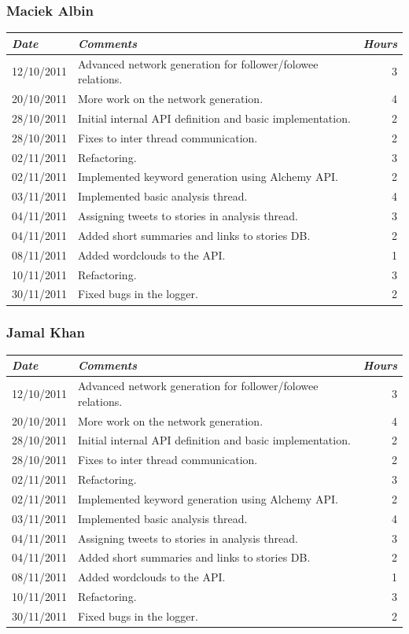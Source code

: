 \documentclass[a4paper,12pt]{article}
\begin{document}
	  \subsubsection{Maciek Albin}
	    \begin{tabular}{l | p{10cm} r}
	     \emph{\large Date} & \emph{\large Comments} & \emph{\large Hours}\\
	     \hline
	     12/10/2011 & Advanced network generation for follower/folowee relations. & 3\\
	     20/10/2011 & More work on the network generation. & 4\\
	     28/10/2011 & Initial internal API definition and basic implementation. & 2\\
	     28/10/2011 & Fixes to inter thread communication. & 2\\
	     02/11/2011 & Refactoring. & 3\\
	     02/11/2011 & Implemented keyword generation using Alchemy API. & 2\\
	     03/11/2011 & Implemented basic analysis thread. & 4\\
	     04/11/2011 & Assigning tweets to stories in analysis thread. & 3\\
	     04/11/2011 & Added short summaries and links to stories DB. & 2\\
	     08/11/2011 & Added wordclouds to the API. & 1\\
	     10/11/2011 & Refactoring. & 3\\
	     30/11/2011 & Fixed bugs in the logger. & 2
	    \end{tabular}
	    
	  \subsubsection{Jamal Khan}
	  \begin{tabular}{l | p{10cm} r}
     \emph{\large Date} & \emph{\large Comments} & \emph{\large Hours}\\
     \hline
     12/10/2011 & Advanced network generation for follower/folowee relations. & 3\\
     20/10/2011 & More work on the network generation. & 4\\
     28/10/2011 & Initial internal API definition and basic implementation. & 2\\
     28/10/2011 & Fixes to inter thread communication. & 2\\
     02/11/2011 & Refactoring. & 3\\
     02/11/2011 & Implemented keyword generation using Alchemy API. & 2\\
     03/11/2011 & Implemented basic analysis thread. & 4\\
     04/11/2011 & Assigning tweets to stories in analysis thread. & 3\\
     04/11/2011 & Added short summaries and links to stories DB. & 2\\
     08/11/2011 & Added wordclouds to the API. & 1\\
     10/11/2011 & Refactoring. & 3\\
     30/11/2011 & Fixed bugs in the logger. & 2
    \end{tabular}
	
\end{document}
